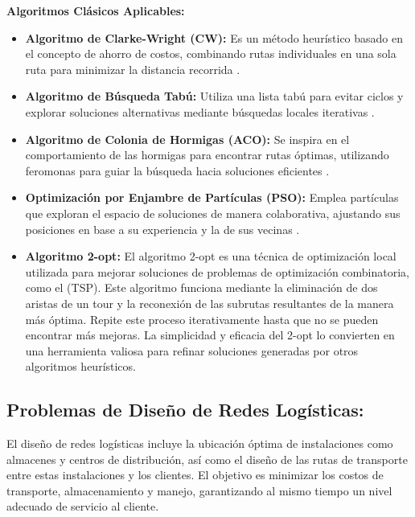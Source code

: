 \documentclass[11pt,a4paper,spanish]{book}
\begin{document}
	\textbf{Algoritmos Clásicos Aplicables:}
	\begin{itemize}
		\item \textbf{Algoritmo de Clarke-Wright (CW):} Es un método heurístico basado en el concepto de ahorro de costos, combinando rutas individuales en una sola ruta para minimizar la distancia recorrida \cite{clarkeWright}.
		\item \textbf{Algoritmo de Búsqueda Tabú:} Utiliza una lista tabú para evitar ciclos y explorar soluciones alternativas mediante búsquedas locales iterativas \cite{glover1989tabu}.
		\item \textbf{Algoritmo de Colonia de Hormigas (ACO):} Se inspira en el comportamiento de las hormigas para encontrar rutas óptimas, utilizando feromonas para guiar la búsqueda hacia soluciones eficientes \cite{dorigo1997ant}.
		\item \textbf{Optimización por Enjambre de Partículas (PSO):} Emplea partículas que exploran el espacio de soluciones de manera colaborativa, ajustando sus posiciones en base a su experiencia y la de sus vecinas \cite{kennedy1995particle}.
        \item \textbf{Algoritmo 2-opt:} El algoritmo 2-opt es una técnica de optimización local utilizada para mejorar soluciones de problemas de optimización combinatoria, como el (TSP). Este algoritmo funciona mediante la eliminación de dos aristas de un tour y la reconexión de las subrutas resultantes de la manera más óptima. Repite este proceso iterativamente hasta que no se pueden encontrar más mejoras. La simplicidad y eficacia del 2-opt lo convierten en una herramienta valiosa para refinar soluciones generadas por otros algoritmos heurísticos. \cite{lawler1985}

	\end{itemize}
	
\subsection{Problemas de Diseño de Redes Logísticas:} 
	
	El diseño de redes logísticas incluye la ubicación óptima de instalaciones como almacenes y centros de distribución, así como el diseño de las rutas de transporte entre estas instalaciones y los clientes. El objetivo es minimizar los costos de transporte, almacenamiento y manejo, garantizando al mismo tiempo un nivel adecuado de servicio al cliente.
	
\end{document}
